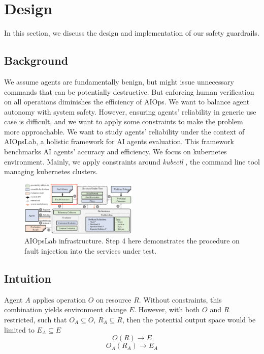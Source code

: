 \section{Design}

In this section, we discuss the design and implementation of our safety guardrails.

\subsection{Background}

We assume agents are fundamentally benign, but might issue unnecessary commands that can be potentially destructive. But enforcing human verification on all operations diminishes the efficiency of AIOps. We want to balance agent autonomy with system safety. However, ensuring agents' reliability in generic use case is difficult, and we want to apply some constraints to make the problem more approachable. We want to study agents' reliability under the context of AIOpsLab, a holistic framework for AI agents evaluation. This framework benchmarks AI agents' accuracy and efficiency. We focus on kubernetes environment. Mainly, we apply constraints around \textit{kubectl} \cite{Kubernetes_2024}, the command line tool managing kubernetes clusters. 

\begin{figure}[htbp]
    \centering
    \includegraphics[width=0.5\textwidth]{fig1.png}
    \caption{AIOpsLab infrastructure. Step 4 here demonstrates the procedure on fault injection into the services under test.}
    \label{fig:example}
\end{figure}

\subsection{Intuition}

Agent $A$ applies operation $O$ on resource $R$. Without constraints, this combination yields environment change $E$. However, with both $O$ and $R$ restricted, such that $O_A \subseteq O$, $R_A \subseteq R$, then the potential output space would be limited to $E_A \subseteq E$
\[ O(R) \rightarrow E \]
\[ O_A(R_A) \rightarrow E_A \]

